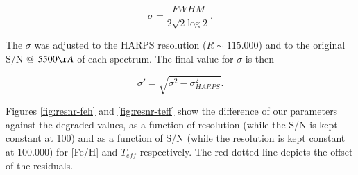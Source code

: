 \documentclass{aa}
\begin{document}
\begin{equation}
\label{eq:fwhm}
\sigma = \frac{FWHM}{2\sqrt{2\log{2}}}. 
\end{equation}

The $\sigma$ was adjusted to the HARPS resolution ($R\sim115.000$) and to the original S/N @ $5500 \AA$  of each spectrum. The final value for $\sigma$ is then





\begin{equation}
\sigma' = \sqrt{\sigma^2-\sigma_{HARPS}^2}.
\end{equation}

Figures \ref{fig:resnr-feh} and \ref{fig:resnr-teff} show the difference of our parameters against the degraded values, as a function of resolution (while the S/N is kept constant at 100) and as a function of S/N (while the resolution is kept constant at 100.000) for [Fe/H] and $T_{eff}$ respectively. The red dotted line depicts the offset of the residuals. 



\end{document}
